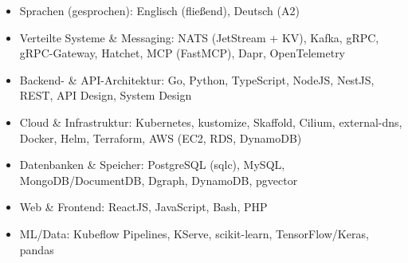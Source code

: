 \documentclass[10pt,a4paper]{resume}
\begin{document}
\begin{itemize}[leftmargin=1.4em,nosep,topsep=2pt]
  \item Sprachen (gesprochen): Englisch (fließend), Deutsch (A2)
  \item Verteilte Systeme \& Messaging: NATS (JetStream + KV), Kafka, gRPC, gRPC-Gateway, Hatchet, MCP (FastMCP), Dapr, OpenTelemetry
  \item Backend- \& API-Architektur: Go, Python, TypeScript, NodeJS, NestJS, REST, API Design, System Design
  \item Cloud \& Infrastruktur: Kubernetes, kustomize, Skaffold, Cilium, external-dns, Docker, Helm, Terraform, AWS (EC2, RDS, DynamoDB)
  \item Datenbanken \& Speicher: PostgreSQL (sqlc), MySQL, MongoDB/DocumentDB, Dgraph, DynamoDB, pgvector
  \item Web \& Frontend: ReactJS, JavaScript, Bash, PHP
  \item ML/Data: Kubeflow Pipelines, KServe, scikit-learn, TensorFlow/Keras, pandas
\end{itemize}
\end{document}
